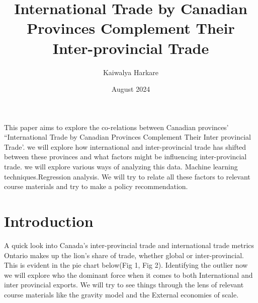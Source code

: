 \documentclass[12pt]{article}
\title{International Trade by
Canadian Provinces Complement Their Inter-provincial Trade}
\author{Kaiwalya Harkare}
\date{August 2024}
\begin{document}
\maketitle

\newpage

\section*{}{
This paper aims to explore the co-relations between Canadian provinces' “International Trade by
Canadian Provinces Complement Their Inter provincial Trade'. we will explore how international and inter-provincial trade has shifted between these provinces and what factors might be influencing inter-provincial trade.
we will explore various ways of analyzing this data. Machine learning techniques.Regression analysis.
We will try to relate all these factors to relevant course materials and try to make a policy recommendation.
}

\newpage
\section*{Introduction}{

A quick look into Canada's inter-provincial trade and international trade metrics Ontario makes up the lion's share of trade, whether global or inter-provincial.
This is evident in the pie chart below(Fig 1, Fig 2).
Identifying the outlier now we will explore who the dominant force when it comes to both International and inter provincial exports.
We will try to see things through the lens of relevant course materials like the gravity model and the External economies of scale.
}
\end{document}
